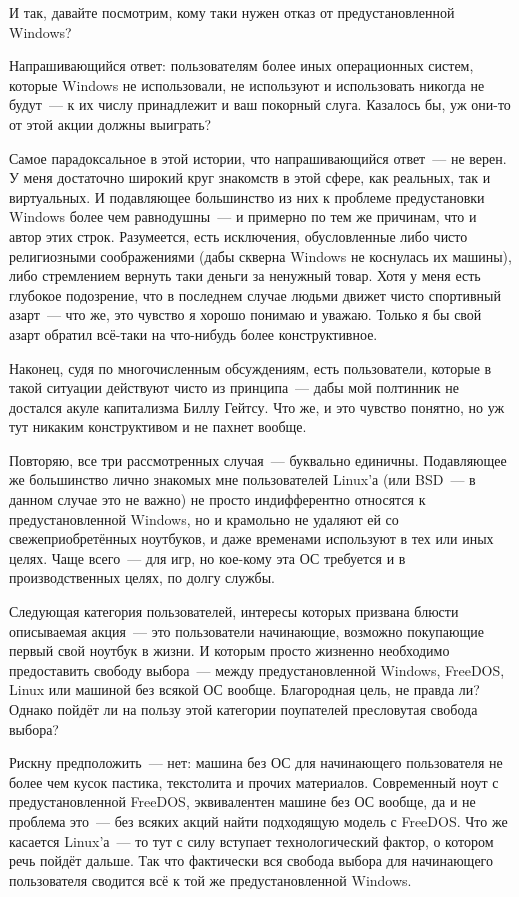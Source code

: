 И так, давайте посмотрим, кому таки нужен отказ от предустановленной Windows?

Напрашивающийся ответ: пользователям более иных операционных систем, которые Windows не использовали, не используют и использовать никогда не будут~--- к их числу принадлежит и ваш покорный слуга. Казалось бы, уж они-то от этой акции должны выиграть?

Самое парадоксальное в этой истории, что напрашивающийся ответ~--- не верен. У меня достаточно широкий круг знакомств в этой сфере, как реальных, так и виртуальных. И подавляющее большинство из них к проблеме предустановки Windows более чем равнодушны~--- и примерно по тем же причинам, что и автор этих строк. Разумеется, есть исключения, обусловленные либо чисто религиозными соображениями (дабы скверна Windows не коснулась их машины), либо стремлением вернуть таки деньги за ненужный товар. Хотя у меня есть глубокое подозрение, что в последнем случае людьми движет чисто спортивный азарт~--- что же, это чувство я хорошо понимаю и уважаю. Только я бы свой азарт обратил всё-таки на что-нибудь более конструктивное.

Наконец, судя по многочисленным обсуждениям, есть пользователи, которые в такой ситуации действуют чисто из принципа~--- дабы мой полтинник не достался акуле капитализма Биллу Гейтсу. Что же, и это чувство понятно, но уж тут никаким конструктивом и не пахнет вообще.

Повторяю, все три рассмотренных случая~--- буквально единичны. Подавляющее же большинство лично знакомых мне пользователей Linux'а (или BSD~--- в данном случае это не важно) не просто индифферентно относятся к предустановленной Windows, но и крамольно не удаляют ей со свежеприобретённых ноутбуков, и даже временами используют в тех или иных целях. Чаще всего~--- для игр, но кое-кому эта ОС требуется и в производственных целях, по долгу службы.

Следующая категория пользователей, интересы которых призвана блюсти описываемая акция~--- это пользователи начинающие, возможно покупающие первый свой ноутбук в жизни. И которым просто жизненно необходимо предоставить свободу выбора~--- между предустановленной Windows, FreeDOS, Linux или машиной без всякой ОС вообще. Благородная цель, не правда ли? Однако пойдёт ли на пользу этой категории поупателей пресловутая свобода выбора?

Рискну предположить~--- нет: машина без ОС для начинающего пользователя не более чем кусок пастика, текстолита и прочих материалов. Современный ноут с предустановленной FreeDOS, эквивалентен машине без ОС вообще, да и не проблема это~--- без всяких акций найти подходящую модель с FreeDOS. Что же касается Linux'а~--- то тут с силу вступает технологический фактор, о котором речь пойдёт дальше. Так что фактически вся свобода выбора для начинающего пользователя сводится всё к той же предустановленной Windows.

